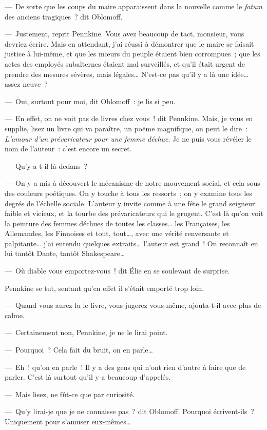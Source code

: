 \documentclass[french,twoside]{book} %
\begin{document}
— De sorte que les coups du maire apparaissent dans la nouvelle comme le \emph{fatum} des anciens tragiques ? dit Oblomoff.\par
— Justement, reprit Pennkine. Vous avez beaucoup de tact, monsieur, vous devriez écrire. Mais en attendant, j’ai réussi à démontrer que le maire se faisait justice à lui-même, et que les mœurs du peuple étaient bien corrompues ; que les actes des employés subalternes étaient mal surveillés, et qu’il était urgent de prendre des mesures sévères, mais légales… N’est-ce pas qu’il y a là une idée… assez neuve ?\par
— Oui, surtout pour moi, dit Oblomoff : je lis si peu.\par
— En effet, on ne voit pas de livres chez vous ! dit Pennkine. Mais, je vous en supplie, lisez un livre qui va paraître, un poëme magnifique, on peut le dire : \emph{L’amour d’un prévaricateur pour une femme déchue}. Je ne puis vous révéler le nom de l’auteur : c’est encore un secret.\par
— Qu’y a-t-il là-dedans ?\par
— On y a mis à découvert le mécanisme de notre mouvement social, et cela sous des couleurs poétiques. On y touche à tous les ressorts ; on y examine tous les degrés de l’échelle sociale. L’auteur y invite comme à une fête le grand seigneur faible et vicieux, et la tourbe des prévaricateurs qui le grugent. C’est là qu’on voit la peinture des femmes déchues de toutes les classes… les Françaises, les Allemandes, les Finnoises et tout, tout…, avec une vérité renversante et palpitante… j’ai entendu quelques extraits… l’auteur est grand ! On reconnaît en lui tantôt Dante, tantôt Shakespeare…\par
— Où diable vous emportez-vous ! dit Élie en se soulevant de surprise.\par
Pennkine se tut, sentant qu’en effet il s’était emporté trop loin.\par
— Quand vous aurez lu le livre, vous jugerez vous-même, ajouta-t-il avec plus de calme.\par
— Certainement non, Pennkine, je ne le lirai point.\par
— Pourquoi ? Cela fait du bruit, on en parle…\par
— Eh ! qu’on en parle ! Il y a des gens qui n’ont rien d’autre à faire que de parler. C’est là surtout qu’il y a beaucoup d’appelés.\par
— Mais lisez, ne fût-ce que par curiosité.\par
— Qu’y lirai-je que je ne connaisse pas ? dit Oblomoff. Pourquoi écrivent-ils ? Uniquement pour s’amuser eux-mêmes…\par
\end{document}
